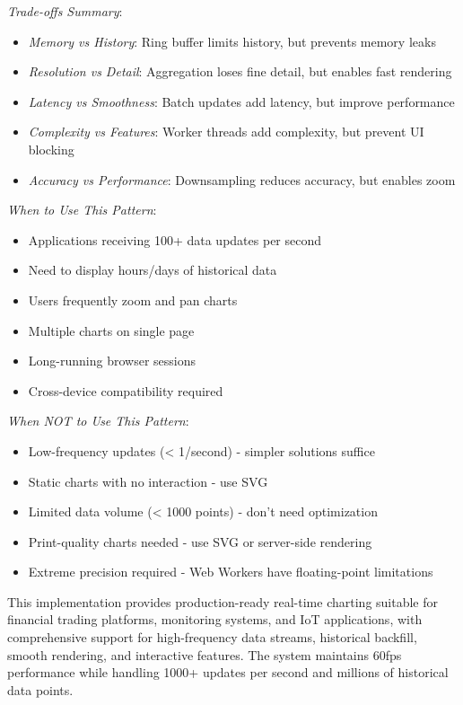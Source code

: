 \documentclass[11pt]{article}
\begin{document}
\emph{Trade-offs Summary}:

\begin{itemize}
\item \emph{Memory vs History}: Ring buffer limits history, but prevents memory leaks
\item \emph{Resolution vs Detail}: Aggregation loses fine detail, but enables fast rendering
\item \emph{Latency vs Smoothness}: Batch updates add latency, but improve performance
\item \emph{Complexity vs Features}: Worker threads add complexity, but prevent UI blocking
\item \emph{Accuracy vs Performance}: Downsampling reduces accuracy, but enables zoom
\end{itemize}

\emph{When to Use This Pattern}:

\begin{itemize}
\item Applications receiving 100+ data updates per second
\item Need to display hours/days of historical data
\item Users frequently zoom and pan charts
\item Multiple charts on single page
\item Long-running browser sessions
\item Cross-device compatibility required
\end{itemize}

\emph{When NOT to Use This Pattern}:

\begin{itemize}
\item Low-frequency updates (< 1/second) - simpler solutions suffice
\item Static charts with no interaction - use SVG
\item Limited data volume (< 1000 points) - don't need optimization
\item Print-quality charts needed - use SVG or server-side rendering
\item Extreme precision required - Web Workers have floating-point limitations
\end{itemize}

This implementation provides production-ready real-time charting suitable for financial trading platforms, monitoring systems, and IoT applications, with comprehensive support for high-frequency data streams, historical backfill, smooth rendering, and interactive features. The system maintains 60fps performance while handling 1000+ updates per second and millions of historical data points.
\end{document}
